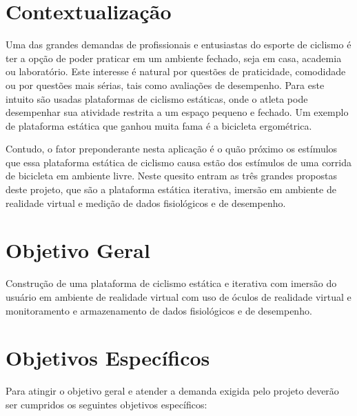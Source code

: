 \section{Contextualização}

Uma das grandes demandas de profissionais e entusiastas do esporte de ciclismo é ter a opção de poder praticar em um ambiente fechado, seja em casa, academia ou laboratório. Este interesse é natural por questões de praticidade, comodidade ou por questões mais sérias, tais como avaliações de desempenho. Para este intuito são usadas plataformas de ciclismo estáticas, onde o atleta pode desempenhar sua atividade restrita a um espaço pequeno e fechado. Um exemplo de plataforma estática que ganhou muita fama é a bicicleta ergométrica.

Contudo, o fator preponderante nesta aplicação é o quão próximo os estímulos que essa plataforma estática de ciclismo causa estão dos estímulos de uma corrida de bicicleta em ambiente livre. Neste quesito entram as três grandes propostas deste projeto, que são a plataforma estática iterativa, imersão em ambiente de realidade virtual e medição de dados fisiológicos e de desempenho.

\section{Objetivo Geral}

	Construção de uma plataforma de ciclismo estática e iterativa com imersão do usuário em ambiente de realidade virtual com uso de óculos de realidade virtual e monitoramento e armazenamento de dados fisiológicos e de desempenho.

\section{Objetivos Específicos}

        	Para atingir o objetivo geral e atender a demanda exigida pelo projeto deverão ser cumpridos os seguintes objetivos específicos:

